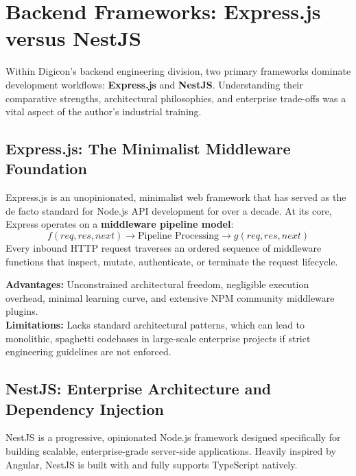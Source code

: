\section{Backend Frameworks: Express.js versus NestJS}
\label{sec:tech_frameworks}

Within Digicon's backend engineering division, two primary frameworks dominate development workflows: \textbf{Express.js} and \textbf{NestJS}. Understanding their comparative strengths, architectural philosophies, and enterprise trade-offs was a vital aspect of the author's industrial training.

\subsection{Express.js: The Minimalist Middleware Foundation}
Express.js is an unopinionated, minimalist web framework that has served as the de facto standard for Node.js API development for over a decade. At its core, Express operates on a \textbf{middleware pipeline model}:
\begin{equation}
    f(req, res, next) \longrightarrow \text{Pipeline Processing} \longrightarrow g(req, res, next)
\end{equation}
Every inbound HTTP request traverses an ordered sequence of middleware functions that inspect, mutate, authenticate, or terminate the request lifecycle. 

\textbf{Advantages:} Unconstrained architectural freedom, negligible execution overhead, minimal learning curve, and extensive NPM community middleware plugins. \\
\textbf{Limitations:} Lacks standard architectural patterns, which can lead to monolithic, spaghetti codebases in large-scale enterprise projects if strict engineering guidelines are not enforced.

\subsection{NestJS: Enterprise Architecture and Dependency Injection}
NestJS is a progressive, opinionated Node.js framework designed specifically for building scalable, enterprise-grade server-side applications. Heavily inspired by Angular, NestJS is built with and fully supports TypeScript natively.

